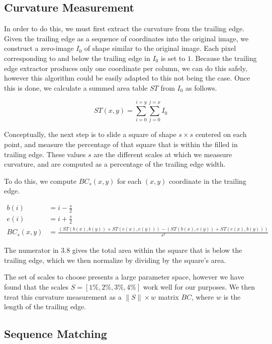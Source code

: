\subsection{Curvature Measurement}

In order to do this, we must first extract the curvature from the trailing edge.
Given the trailing edge as a sequence of coordinates into the original image, we construct a zero-image $I_0$ of shape similar to the original image.
Each pixel corresponding to and below the trailing edge in $I_0$ is set to $1$.
Because the trailing edge extractor produces only one coordinate per column, we can do this safely, however this algorithm could be easily adapted to this not being the case.
Once this is done, we calculate a summed area table \cite{crow1984summed} $ST$ from $I_0$ as follows.

\begin{equation}
ST(x,y) = \sum_{i=0}^{i=y}\sum_{j=0}^{j=x} I_0 
\end{equation}

Conceptually, the next step is to slide a square of shape $s \times s$ centered on each point, and measure the percentage of that square that is within the filled in trailing edge.
These values $s$ are the different scales at which we meassure curvature, and are computed as a percentage of the trailing edge width.

To do this, we compute $BC_s(x, y)$ for each $(x, y)$ coordinate in the trailing edge.

\begin{align}
b(i) &= i - \frac{s}{2}\\
e(i) &= i + \frac{s}{2}\\
BC_s(x,y) &= \frac{(ST(b(x), b(y)) + ST(e(x), e(y))) - (ST(b(x), e(y)) + ST(e(x), b(y)))}{s^2}
\end{align}

The numerator in 3.8 gives the total area within the square that is below the trailing edge, which we then normalize by dividing by the square's area.

The set of scales to choose presents a large parameter space, however we have found that the scales $S = [1\%, 2\%, 3\%, 4\%]$ work well for our purposes.
We then treat this curvature measurement as a $\|S\| \times w$ matrix $BC$, where $w$ is the length of the trailing edge.

\subsection{Sequence Matching}

